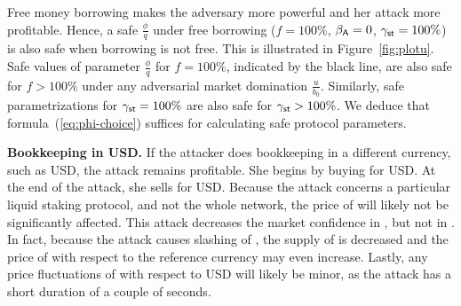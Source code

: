 Free money borrowing makes the adversary more powerful
and her attack more profitable.
Hence, a safe $\frac{\phi}{q}$ under free
borrowing ($f = 100\%$, $\beta_{\textsf{A}} = 0$, $\gamma_{\textsf{st}} = 100\%$)
is also safe when borrowing is not free.
This is illustrated in
Figure~\ref{fig:plotu}. Safe values of parameter $\frac{\phi}{q}$
for $f = 100\%$, indicated by the black line, are also safe for $f > 100\%$
under any adversarial market domination $\frac{u}{b_0}$.
Similarly, safe parametrizations for $\gamma_{\textsf{st}} = 100\%$ are also safe
for $\gamma_{\textsf{st}} > 100\%$.
We deduce that formula~(\ref{eq:phi-choice}) suffices for calculating
safe protocol parameters.




\noindent
\textbf{Bookkeeping in USD.}
If the attacker does bookkeeping in a different currency,
such as USD, the attack remains profitable. She begins by buying
\asset for USD. At the end of the attack, she sells \asset for USD.
Because the attack concerns a particular liquid staking protocol, and
not the whole \asset network, the price of \asset will likely not
be significantly affected.
This attack decreases the market confidence in \stasset,
but not in \asset.
In fact, because
the attack causes slashing of \asset, the supply of \asset is decreased
and the price of \asset with respect to the reference currency may
even increase.
Lastly, any price fluctuations of \asset with respect to USD will likely be
minor, as the attack has a short duration of a couple of seconds.

